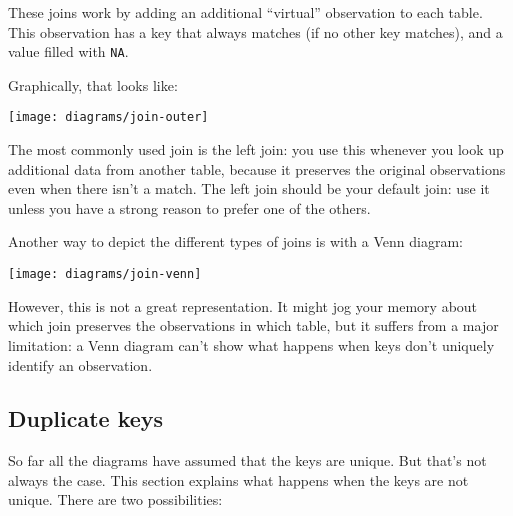 \documentclass[]{book}
\begin{document}
These joins work by adding an additional ``virtual'' observation to each
table. This observation has a key that always matches (if no other key
matches), and a value filled with \texttt{NA}.

Graphically, that looks like:

\begin{center}\texttt{[image: diagrams/join-outer]} \end{center}

The most commonly used join is the left join: you use this whenever you
look up additional data from another table, because it preserves the
original observations even when there isn't a match. The left join
should be your default join: use it unless you have a strong reason to
prefer one of the others.

Another way to depict the different types of joins is with a Venn
diagram:

\begin{center}\texttt{[image: diagrams/join-venn]} \end{center}

However, this is not a great representation. It might jog your memory
about which join preserves the observations in which table, but it
suffers from a major limitation: a Venn diagram can't show what happens
when keys don't uniquely identify an observation.

\subsection{Duplicate keys}\label{join-matches}

So far all the diagrams have assumed that the keys are unique. But
that's not always the case. This section explains what happens when the
keys are not unique. There are two possibilities:
\end{document}
